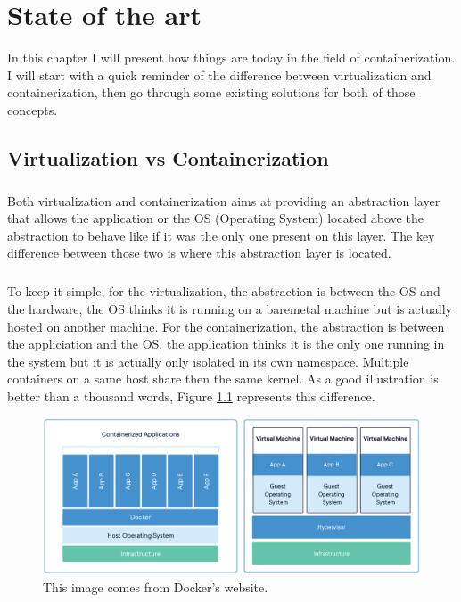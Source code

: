 \chapter{State of the art}

In this chapter I will present how things are today in the field of containerization.  I will start with a quick reminder of the difference between virtualization and containerization, then go through some existing solutions for both of those concepts.

\section{Virtualization vs Containerization}
\paragraph{}Both virtualization and containerization aims at providing an abstraction layer that allows the application or the OS (Operating System) located above the abstraction to behave like if it was the only one present on this layer.  The key difference between those two is where this abstraction layer is located.  

\paragraph{}To keep it simple, for the virtualization, the abstraction is between the OS and the hardware, the OS thinks it is running on a baremetal machine but is actually hosted on another machine.  For the containerization, the abstraction is between the appliciation and the OS, the application thinks it is the only one running in the system but it is actually only isolated in its own namespace.  Multiple containers on a same host share then the same kernel.  As a good illustration is better than a thousand words, Figure \ref{fig:virt-vs-cont} represents this difference. 
\begin{figure}[!h]
  \begin{center}
    \includegraphics[width=\linewidth]{images/Virtualization-Containerization.png}
    \caption{This image comes from Docker's website\cite{docker}.}
    \label{fig:virt-vs-cont}
  \end{center}
\end{figure}

